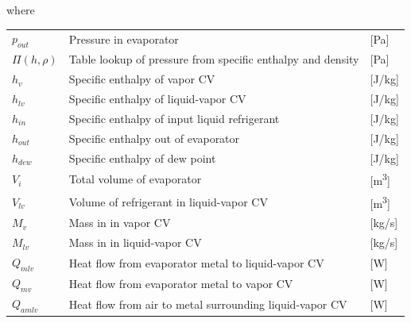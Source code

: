 where\\


\begin{center}
	\begin{tabular}{l p{10cm} l}
		$ p_{out} $      & Pressure in evaporator                                                   & [\si{Pa}]                         \\
		$\Pi(h,\rho) $   & Table lookup of pressure from specific enthalpy and density              & [\si{Pa}]                         \\
		$h_{v} $         & Specific enthalpy of vapor CV                                            & [\si{J}/\si{kg}]                  \\
		$h_{lv} $        & Specific enthalpy of liquid-vapor CV                                     & [\si{J}/\si{kg}]                  \\
		$h_{in} $        & Specific enthalpy of input liquid refrigerant                            & [\si{J}/\si{kg}]                  \\
		$h_{out}$        & Specific enthalpy out of evaporator                                      & [\si{J}/\si{kg}]                  \\
		$h_{dew}$        & Specific enthalpy of dew point                                           & [\si{J}/\si{kg}]                  \\
		$V_{i} $         & Total volume of evaporator                                               & [\si{m^3}]                        \\
		$V_{lv} $        & Volume of refrigerant in liquid-vapor CV                                 & [\si{m^3}]                        \\
		$M_{v}$          & Mass in	in vapor CV                                                      & [\si{kg}/\si{s}]                  \\
		$M_{lv}$         & Mass in	in liquid-vapor CV                                               & [\si{kg}/\si{s}]                  \\
		$Q_{mlv}$        & Heat flow from evaporator metal to liquid-vapor CV                       & [\si{W}]                          \\
		$Q_{mv}$         & Heat flow from evaporator metal to vapor CV                              & [\si{W}]                          \\
		$Q_{amlv}$       & Heat flow from air to metal surrounding liquid-vapor CV                  & [\si{W}]                          \\

\end{tabular}
\end{center}
